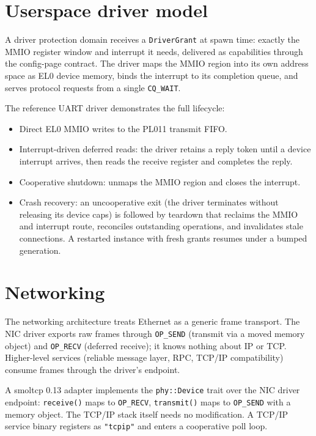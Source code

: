 \section{Userspace driver model}

A driver protection domain receives a \texttt{DriverGrant} at spawn time:
exactly the MMIO register window and interrupt it needs, delivered as
capabilities through the config-page contract. The driver maps the MMIO region
into its own address space as EL0 device memory, binds the interrupt to its
completion queue, and serves protocol requests from a single \texttt{CQ\_WAIT}.

The reference UART driver demonstrates the full lifecycle:
\begin{itemize}
    \item Direct EL0 MMIO writes to the PL011 transmit FIFO.
    \item Interrupt-driven deferred reads: the driver retains a reply token
        until a device interrupt arrives, then reads the receive register and
        completes the reply.
    \item Cooperative shutdown: unmaps the MMIO region and closes the interrupt.
    \item Crash recovery: an uncooperative exit (the driver terminates without
        releasing its device caps) is followed by teardown that reclaims the
        MMIO and interrupt route, reconciles outstanding operations, and
        invalidates stale connections. A restarted instance with fresh grants
        resumes under a bumped generation.
\end{itemize}

\section{Networking}

The networking architecture treats Ethernet as a generic frame transport. The
NIC driver exports raw frames through \texttt{OP\_SEND} (transmit via a moved
memory object) and \texttt{OP\_RECV} (deferred receive); it knows nothing about
IP or TCP. Higher-level services (reliable message layer, RPC, TCP/IP
compatibility) consume frames through the driver's endpoint.

A smoltcp 0.13 adapter implements the \texttt{phy::Device} trait over the NIC
driver endpoint: \texttt{receive()} maps to \texttt{OP\_RECV},
\texttt{transmit()} maps to \texttt{OP\_SEND} with a memory object. The TCP/IP
stack itself needs no modification. A TCP/IP service binary registers as
\texttt{"tcpip"} and enters a cooperative poll loop.

